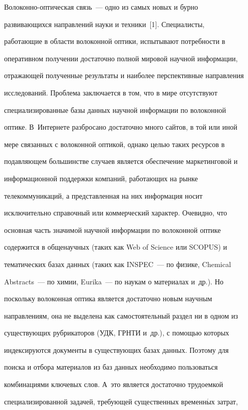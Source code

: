       


    Волоконно-оптическая связь~--- одно из самых новых и бурно 


развивающихся направлений науки и техники~[1]. Специалисты, 


работающие в области волоконной оптики, испытывают потребности в 


оперативном получении достаточно полной мировой научной информации, 


отражающей полученные результаты и наиболее перспективные направления 


исследований. Проблема заключается в том, что в мире отсутствуют 


специализированные базы данных научной информации по волоконной 


оптике. В~Интернете разбросано достаточно много сайтов, в той или иной 


мере связанных с волоконной оптикой, однако целью таких ресурсов в 


подавляющем большинстве случаев является обеспечение маркетинговой и 


информационной поддержки компаний, работающих на рынке 


телекоммуникаций, а представленная на них информация носит 


исключительно справочный или коммерческий характер. Очевидно, что 


основная часть значимой научной информации по волоконной оптике 


содержится в общенаучных (таких как Web of Science или SCOPUS) и 


тематических базах данных (таких как INSPEC~--- по физике, Chemical 


Abstracts~--- по химии, Eurika~--- по наукам о материалах и~др.). Но 


поскольку волоконная оптика является достаточно новым научным 


направлениям, она не выделена как самостоятельный раздел ни в одном из 


существующих рубрикаторов (УДК, ГРНТИ и~др.), с помощью которых 


индексируются документы в существующих базах данных. Поэтому для 


поиска и отбора материалов из баз данных необходимо пользоваться 


комбинациями ключевых слов. А~это является достаточно трудоемкой 


специализированной задачей, требующей существенных временн$\acute{\mbox{ы}}$х затрат, 


